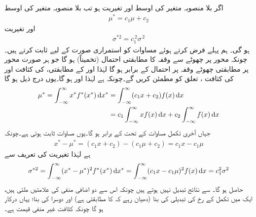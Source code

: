 \quad {}\\
اگر بلا منصوبہ متغیر  کی اوسط  اور تغیریت  ہو تب بلا منصوبہ متغیر  کی اوسط
\begin{align}\label{مساوات_شماریات_اوسط_تغیریت_ٹ}
\mu^*=c_1\mu+c_2
\end{align}
 اور تغیریت
\begin{align}\label{مساوات_شماریات_اوسط_تغیریت_ث}
\sigma^{*2}=c_1^{\,2}\sigma^{\,2}
\end{align}
ہو گی۔
\quad
ہم پہلے  فرض کرتے ہوئے مساوات  کو استمراری صورت کے لیے ثابت کرتے ہیں۔چونکہ محور  پر چھوٹے سے وقفہ  کا مطابقتی احتمال (تخمیناً)  ہو گا جو ہر صورت  محور     پر مطابقتی چھوٹے وقفہ  پر احتمال  کے برابر ہو گا لہٰذا  اور  کے مطابقتی،  کی کثافت  اور  کی کثافت ،  تعلق  کو مطمئن کریں گے۔چونکہ  ہے لہٰذا  اور  ہو گا۔یوں درج ذیل ہو گا
\begin{align*}
\mu^*=\int_{-\infty}^{\infty} x^*f^*(x^*)\dif x^*&=\int_{-\infty}^{\infty} (c_1x+c_2)f(x)\dif x\\
&=c_1\int_{-\infty}^{\infty}xf(x)\dif x+c_2\int_{-\infty}^{\infty}f(x)\dif x
\end{align*}
جہاں آخری تکمل مساوات  کے تحت  کے برابر ہو گا۔یوں  مساوات  ثابت ہوتی ہے۔چونکہ
\begin{align*}
x^*-\mu^*=(c_1x+c_2)-(c_1\mu+c_2)=c_1x-c_1\mu
\end{align*}
ہے لہٰذا تغیریت کی تعریف سے
\begin{align*}
\sigma^{*2}=\int_{-\infty}^{\infty} (x^*-\mu^*)^2f^*(x^*)\dif x^*=\int_{-\infty}^{\infty} (c_1x-c_1\mu)^2f(x)\dif x=c_1^2\sigma^2
\end{align*}
حاصل ہو گا۔  سے نتائج تبدیل نہیں ہوتے ہیں چونکہ اس سے دو اضافی منفی کی علامتیں ملتی ہیں، ایک  میں تکمل کے رخ کی تبدیلی کی بنا (دھیان رہے کہ  کا مطابقتی  ہے) اور دوسرا  کی بنا؛ یہاں  درکار ہو گا چونکہ کثافت غیر منفی قیمت ہے۔  

